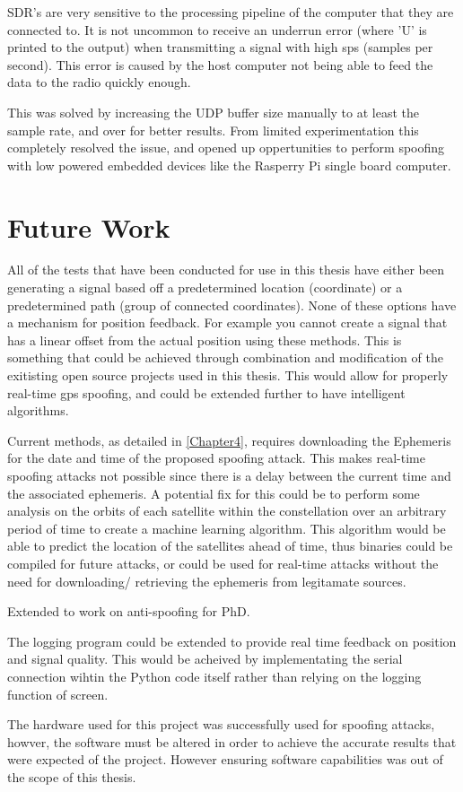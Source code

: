 SDR's are very sensitive to the processing pipeline of the computer that they are connected to. It is not uncommon to receive an underrun error (where 'U' is printed to the
output) when transmitting a signal with high sps (samples per second). This error is caused by the host computer not being able to feed the data to the radio quickly
enough.

This was solved by increasing the UDP buffer size manually to at least the sample rate, and over for better results. From limited experimentation this completely resolved the issue, and opened up
oppertunities to perform spoofing with low powered embedded devices like the Rasperry Pi single board computer.

\section{Future Work}
All of the tests that have been conducted for use in this thesis have either been generating a signal based off a predetermined location (coordinate) or a predetermined
path (group of connected coordinates). None of these options have a mechanism for position feedback. For example you cannot create a signal that has a linear offset from
the actual position using these methods. This is something that could be achieved through combination and modification of the exitisting open source projects used in this
thesis. This would allow for properly real-time gps spoofing, and could be extended further to have intelligent algorithms.

Current methods, as detailed in \ref{Chapter4}, requires downloading the Ephemeris for the date and time of the proposed spoofing attack. This makes real-time spoofing
attacks not possible since there is a delay between the current time and the associated ephemeris. A potential fix for this could be to perform some analysis on the
orbits of each satellite within the constellation over an arbitrary period of time to create a machine learning algorithm. This algorithm would be able to predict the
location of the satellites ahead of time, thus binaries could be compiled for future attacks, or could be used for real-time attacks without the need for downloading/
retrieving the ephemeris from legitamate sources.

Extended to work on anti-spoofing for PhD.

The logging program could be extended to provide real time feedback on position and signal quality. This would be acheived by implementating the serial connection wihtin
the Python code itself rather than relying on the logging function of screen.

The hardware used for this project was successfully used for spoofing attacks, howver, the software must be altered in order to achieve the accurate results that were
expected of the project. However ensuring software capabilities was out of the scope of this thesis.